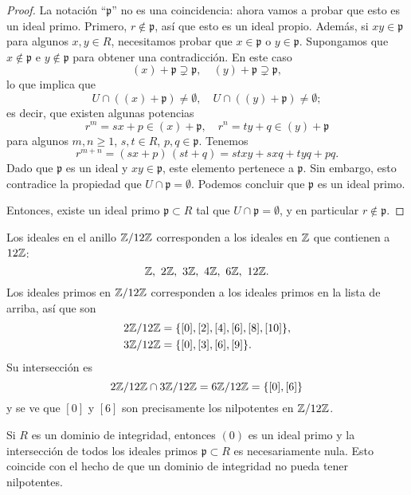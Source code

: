 \begin{proposicion}
\begin{proof}
    La notación ``$\mathfrak{p}$'' no es una coincidencia: ahora vamos a probar
    que esto es un ideal primo. Primero, $r\notin \mathfrak{p}$, así que esto es
    un ideal propio. Además, si $xy \in \mathfrak{p}$ para algunos $x,y\in R$,
    necesitamos probar que $x\in \mathfrak{p}$ o $y\in \mathfrak{p}$. Supongamos
    que $x \notin \mathfrak{p}$ e $y \notin \mathfrak{p}$ para obtener una
    contradicción. En este caso
    \[ (x) + \mathfrak{p} \supsetneq \mathfrak{p}, \quad
       (y) + \mathfrak{p} \supsetneq \mathfrak{p}, \]
    lo que implica que
    \[ U \cap ((x) + \mathfrak{p}) \ne \emptyset, \quad
       U \cap ((y) + \mathfrak{p}) \ne \emptyset; \]
    es decir, que existen algunas potencias
    \[ r^m = sx + p \in (x) + \mathfrak{p}, \quad
       r^n = ty + q \in (y) + \mathfrak{p} \]
    para algunos $m,n \ge 1$, $s,t\in R$, $p,q\in \mathfrak{p}$. Tenemos
    $$r^{m+n} = (sx + p)\,(st + q) = stxy + sxq + tyq + pq.$$
    Dado que $\mathfrak{p}$ es un ideal y $xy \in \mathfrak{p}$, este elemento
    pertenece a $\mathfrak{p}$. Sin embargo, esto contradice la propiedad que
    $U \cap \mathfrak{p} = \emptyset$. Podemos concluir que $\mathfrak{p}$ es
    un ideal primo.

    Entonces, existe un ideal primo $\mathfrak{p} \subset R$ tal que
    $U \cap \mathfrak{p} = \emptyset$, y en particular $r \notin \mathfrak{p}$.
  \end{proof}
\end{proposicion}

\begin{ejemplo}
  Los ideales en el anillo $\mathbb{Z}/12\mathbb{Z}$ corresponden a los ideales en $\mathbb{Z}$ que
  contienen a $12\mathbb{Z}$:
  $$\mathbb{Z}, ~ 2\mathbb{Z}, ~ 3\mathbb{Z}, ~ 4\mathbb{Z}, ~ 6\mathbb{Z}, ~ 12\mathbb{Z}.$$
  Los ideales primos en $\mathbb{Z}/12\mathbb{Z}$ corresponden a los ideales primos en
  la lista de arriba, así que son
  \begin{align*}
    2\mathbb{Z}/12\mathbb{Z} & = \{ [0], [2], [4], [6], [8], [10] \},\\
    3\mathbb{Z}/12\mathbb{Z} & = \{ [0], [3], [6], [9] \}.
  \end{align*}
  Su intersección es
  $$2\mathbb{Z}/12\mathbb{Z} \cap 3\mathbb{Z}/12\mathbb{Z} = 6\mathbb{Z}/12\mathbb{Z} = \{ [0], [6] \}$$
  y se ve que $[0]$ y $[6]$ son precisamente los nilpotentes en $\mathbb{Z}/12\mathbb{Z}$.
\end{ejemplo}

\begin{ejemplo}
  Si $R$ es un dominio de integridad, entonces $(0)$ es un ideal primo y
  la intersección de todos los ideales primos $\mathfrak{p} \subset R$
  es necesariamente nula. Esto coincide con el hecho de que un dominio
  de integridad no pueda tener nilpotentes.
\end{ejemplo}

